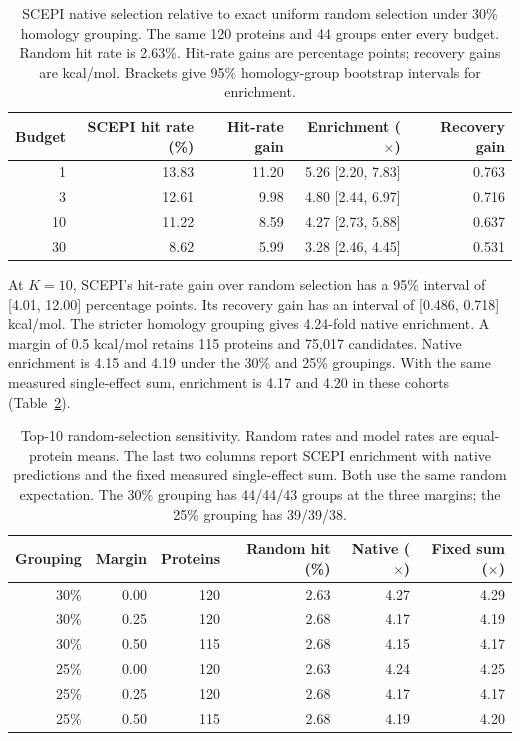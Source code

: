 \documentclass{llncs}
\begin{document}
\begin{table}[H]
\centering
\caption{SCEPI native selection relative to exact uniform random selection under 30\% homology grouping. The same 120 proteins and 44 groups enter every budget. Random hit rate is 2.63\%. Hit-rate gains are percentage points; recovery gains are kcal/mol. Brackets give 95\% homology-group bootstrap intervals for enrichment.}
\label{tab:randombudgets}
\begin{tabular}{rrrrr}
\toprule
Budget & SCEPI hit rate (\%) & Hit-rate gain & Enrichment ($\times$) & Recovery gain \\
\midrule
1 & 13.83 & 11.20 & 5.26 [2.20, 7.83] & 0.763 \\
3 & 12.61 & 9.98 & 4.80 [2.44, 6.97] & 0.716 \\
10 & 11.22 & 8.59 & 4.27 [2.73, 5.88] & 0.637 \\
30 & 8.62 & 5.99 & 3.28 [2.46, 4.45] & 0.531 \\
\bottomrule
\end{tabular}
\end{table}

At $K=10$, SCEPI's hit-rate gain over random selection has a 95\% interval of [4.01, 12.00] percentage points. Its recovery gain has an interval of [0.486, 0.718] kcal/mol. The stricter homology grouping gives 4.24-fold native enrichment. A margin of 0.5 kcal/mol retains 115 proteins and 75,017 candidates. Native enrichment is 4.15 and 4.19 under the 30\% and 25\% groupings. With the same measured single-effect sum, enrichment is 4.17 and 4.20 in these cohorts (Table~\ref{tab:randomsensitivity}).

\begin{table}[H]
\centering
\caption{Top-10 random-selection sensitivity. Random rates and model rates are equal-protein means. The last two columns report SCEPI enrichment with native predictions and the fixed measured single-effect sum. Both use the same random expectation. The 30\% grouping has 44/44/43 groups at the three margins; the 25\% grouping has 39/39/38.}
\label{tab:randomsensitivity}
\begin{tabular}{rrrrrr}
\toprule
Grouping & Margin & Proteins & Random hit (\%) & Native ($\times$) & Fixed sum ($\times$) \\
\midrule
30\% & 0.00 & 120 & 2.63 & 4.27 & 4.29 \\
30\% & 0.25 & 120 & 2.68 & 4.17 & 4.19 \\
30\% & 0.50 & 115 & 2.68 & 4.15 & 4.17 \\
25\% & 0.00 & 120 & 2.63 & 4.24 & 4.25 \\
25\% & 0.25 & 120 & 2.68 & 4.17 & 4.17 \\
25\% & 0.50 & 115 & 2.68 & 4.19 & 4.20 \\
\bottomrule
\end{tabular}
\end{table}
\end{document}
